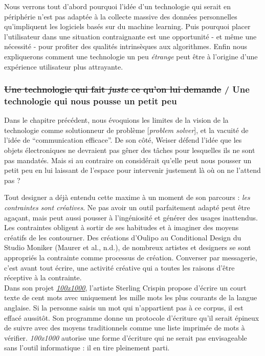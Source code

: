 \documentclass[]{article}
\begin{document}
Nous verrons tout d'abord pourquoi l'idée d'un technologie qui serait en
périphérie n'est pas adaptée à la collecte massive des données
personnelles qu'impliquent les logiciels basés sur du machine learning.
Puis pourquoi placer l'utilisateur dans une situation contraignante est
une opportunité - et même une nécessité - pour profiter des qualités
intrinsèques aux algorithmes. Enfin nous expliquerons comment une
technologie un peu \emph{étrange} peut être à l'origine d'une expérience
utilisateur plus attrayante.

\newpage

\hypertarget{une-technologie-qui-fait-juste-ce-quon-lui-demande-une-technologie-qui-nous-pousse-un-petit-peu}{%
\subsubsection{\texorpdfstring{\sout{Une technologie qui fait
\emph{juste} ce qu'on lui demande} / Une technologie qui nous pousse un
petit
peu}{Une technologie qui fait juste ce qu'on lui demande / Une technologie qui nous pousse un petit peu}}\label{une-technologie-qui-fait-juste-ce-quon-lui-demande-une-technologie-qui-nous-pousse-un-petit-peu}}

Dans le chapitre précédent, nous évoquions les limites de la vision de
la technologie comme solutionneur de problème {[}\emph{problem
solver}{]}, et la vacuité de l'idée de ``communication efficace''. De
son côté, Weiser défend l'idée que les objets électroniques ne devraient
pas gêner des tâches pour lesquelles ils ne sont pas mandatés. Mais si
au contraire on considérait qu'elle peut nous pousser un petit peu en
lui laissant de l'espace pour intervenir justement là où on ne l'attend
pas ?

Tout designer a déjà entendu cette maxime à un moment de son parcours :
\emph{les contraintes sont créatives}. Ne pas avoir un outil
parfaitement adapté peut être agaçant, mais peut aussi pousser à
l'ingéniosité et générer des usages inattendus. Les contraintes obligent
à sortir de ses habitudes et à imaginer des moyens créatifs de les
contourner. Des créations d'Oulipo au Conditional Design du Studio
Moniker (Maurer et al., n.d.), de nombreux artistes et designers se sont
appropriés la contrainte comme processus de création. Converser par
messagerie, c'est avant tout écrire, une activité créative qui a toutes
les raisons d'être réceptive à la contrainte.\\
Dans son projet \href{http://www.100x1000.net/}{\emph{100x1000}},
l'artiste Sterling Crispin propose d'écrire un court texte de cent mots
avec uniquement les mille mots les plus courants de la langue anglaise.
Si la personne saisis un mot qui n'appartient pas à ce corpus, il est
effacé aussitôt. Son programme donne un protocole d'écriture qu'il
serait épineux de suivre avec des moyens traditionnels comme une liste
imprimée de mots à vérifier. \emph{100x1000} autorise une forme
d'écriture qui ne serait pas envisageable sans l'outil informatique : il
en tire pleinement parti.
\end{document}
